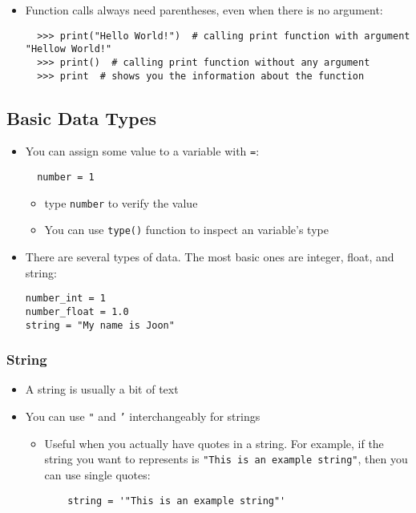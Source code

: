 \documentclass[10pt,article]{article}
\begin{document}
\begin{itemize}
\item Function calls always need parentheses, even when there is no argument:

\begin{verbatim}
  >>> print("Hello World!")  # calling print function with argument "Hellow World!"
  >>> print()  # calling print function without any argument
  >>> print  # shows you the information about the function
\end{verbatim}
\end{itemize}

\subsection{Basic Data Types}
\label{sec:orgc3414bf}
\begin{itemize}
\item You can assign some value to a variable with \texttt{=}:

\begin{verbatim}
  number = 1
\end{verbatim}

\begin{itemize}
\item type \texttt{number} to verify the value
\item You can use \texttt{type()} function to inspect an variable's type
\end{itemize}
\end{itemize}

\begin{itemize}
\item There are several types of data. The most basic ones are integer, float, and string:

\begin{verbatim}
number_int = 1
number_float = 1.0
string = "My name is Joon"
\end{verbatim}
\end{itemize}

\subsubsection{String}
\label{sec:org1ed05ca}
\begin{itemize}
\item A string is usually a bit of text
\item You can use \texttt{"} and \texttt{'} interchangeably for strings
\begin{itemize}
\item Useful when you actually have quotes in a string. For example, if the
string you want to represents is \texttt{"This is an example string"}, then you
can use single quotes:

\begin{verbatim}
    string = '"This is an example string"'
\end{verbatim}
\end{itemize}
\end{itemize}
\end{document}
